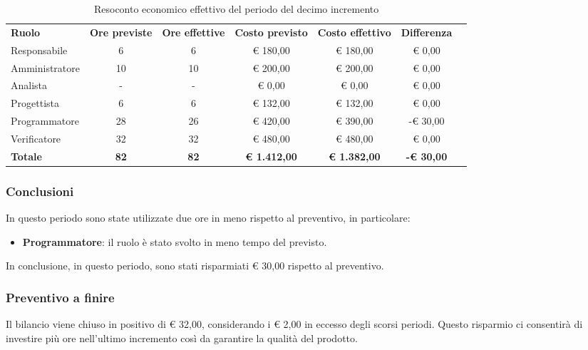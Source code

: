 \documentclass[../piano-di-progetto.tex]{subfiles}
\begin{document}
  \begin{table}[H]
    \centering
    \begin{tabular}{lcccccc}
      \rowcolor{lightgray}
      \textbf{Ruolo}  & \textbf{Ore previste} & \textbf{Ore effettive} & \textbf{Costo previsto} & \textbf{Costo effettivo} & \textbf{Differenza} \\
      Responsabile    & 6           & 6           & € 180,00            & € 180,00            & € 0,00            \\
Amministratore  & 10          & 10          & € 200,00            & € 200,00            & € 0,00            \\
Analista        & -           & -           & € 0,00              & € 0,00              & € 0,00            \\
Progettista     & 6           & 6           & € 132,00            & € 132,00            & € 0,00            \\
Programmatore   & 28          & 26          & € 420,00            & € 390,00            & -€ 30,00          \\
Verificatore    & 32          & 32          & € 480,00            & € 480,00            & € 0,00            \\
\textbf{Totale} & \textbf{82} & \textbf{82} & \textbf{€ 1.412,00} & \textbf{€ 1.382,00} & \textbf{-€ 30,00}

    \end{tabular}
    \caption{Resoconto economico effettivo del periodo del decimo incremento}
  \end{table}

\subsubsection{Conclusioni}
In questo periodo sono state utilizzate due ore in meno rispetto al preventivo, in particolare:
\begin{itemize}
    \item \textbf{Programmatore}: il ruolo è stato svolto in meno tempo del previsto.
\end{itemize}
In conclusione, in questo periodo, sono stati risparmiati € 30,00 rispetto al preventivo.

\subsubsection{Preventivo a finire}
Il bilancio viene chiuso in positivo di € 32,00, considerando i € 2,00 in eccesso degli scorsi periodi. Questo risparmio ci consentirà di investire più ore nell'ultimo incremento così da garantire la qualità del prodotto. 
\end{document}
